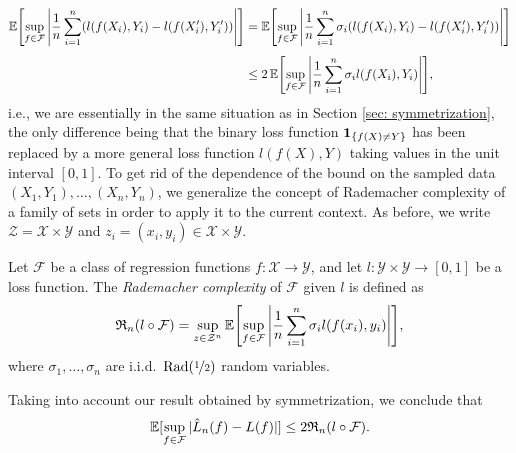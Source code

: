 \begin{align*}
    \Exp\left[\sup_{f \in \mathcal{F}} \abs{\frac{1}{n} \sum_{i=1}^n (l(f(X_i), Y_i) - l(f(X_i'), Y_i'))}\right] &= \Exp\left[\sup_{f \in \mathcal{F}} \abs{\frac{1}{n} \sum_{i=1}^n \sigma_i (l(f(X_i), Y_i) - l(f(X_i'), Y_i'))}\right] \\[4pt]
    &\leq 2 \Exp\left[\sup_{f \in \mathcal{F}} \abs{\frac{1}{n} \sum_{i=1}^n \sigma_i l(f(X_i), Y_i)}\right],
\end{align*}
i.e., we are essentially in the same situation as in Section \ref{sec: symmetrization}, the only difference being that the binary loss function $\indSet{f(X) \neq Y}$ has been replaced by a more general loss function $l(f(X), Y)$ taking values in the unit interval $[0, 1]$. To get rid of the dependence of the bound on the sampled data $(X_1, Y_1), \dots, (X_n, Y_n)$, we generalize the concept of Rademacher complexity of a family of sets in order to apply it to the current context. As before, we write $\mathcal{Z} = \mathcal{X} \times \mathcal{Y}$ and $z_i = (x_i, y_i) \in \mathcal{X} \times \mathcal{Y}$.

\begin{definition}
\label{def: rademacher complexity for general loss}
Let $\mathcal{F}$ be a class of regression functions $f \colon \mathcal{X} \to \mathcal{Y}$, and let $l \colon \mathcal{Y} \times \mathcal{Y} \to [0, 1]$ be a loss function. The \emph{Rademacher complexity} of $\mathcal{F}$ given $l$ is defined as
\[
    \mathfrak{R}_n(l \circ \mathcal{F}) = \sup_{z \in \mathcal{Z}^n} \Exp\left[\sup_{f \in \mathcal{F}} \abs{\frac{1}{n} \sum_{i=1}^n \sigma_i l(f(x_i), y_i)}\right],
\]
where $\sigma_1, \dots, \sigma_n$ are i.i.d.\ $\operatorname{Rad}(\nicefrac{1}{2})$ random variables.
\end{definition}
Taking into account our result obtained by symmetrization, we conclude that
\[
    \Exp[\sup_{f \in \mathcal{F}} \abs*{\hat{L}_n(f) - L(f)}] \leq 2 \mathfrak{R}_n(l \circ \mathcal{F}).
\]

